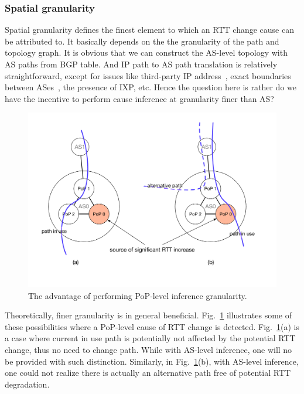 \subsubsection{Spatial granularity}
\label{sec:chap5_spatial}
Spatial granularity defines the finest element to which an RTT change cause can be attributed to.
It basically depends on the the granularity of the path and topology graph. 
It is obvious that we can construct the AS-level topology with AS paths from BGP table.
And IP path to AS path translation is relatively straightforward, except for issues like third-party IP address~\cite{Hyun2003, Luckie2014a, Zhang2010}, exact boundaries between ASes~\cite{Luckie2016}, the presence of IXP\cite{Nomikos2016}, etc.
Hence the question here is rather do we have the incentive to perform cause inference at granularity finer than AS?

\begin{figure}[!htb]
\centering
\includegraphics[width=.9\textwidth]{gfx/chap5/case_pop_topo.pdf}
\caption{The advantage of performing PoP-level inference granularity.}
\label{fig:chap5_case_pop_topo}
\end{figure}

Theoretically, finer granularity is in general beneficial. Fig.~\ref{fig:chap5_case_pop_topo} illustrates some of these possibilities where a PoP-level cause of RTT change is detected.
Fig.~\ref{fig:chap5_case_pop_topo}(a) is a case where current in use path is potentially not affected by the potential RTT change, thus no need to change path. While with AS-level inference, one will no be provided with such distinction. 
Similarly, in Fig.~\ref{fig:chap5_case_pop_topo}(b), with AS-level inference, one could not realize there is actually an alternative path free of potential RTT degradation.

